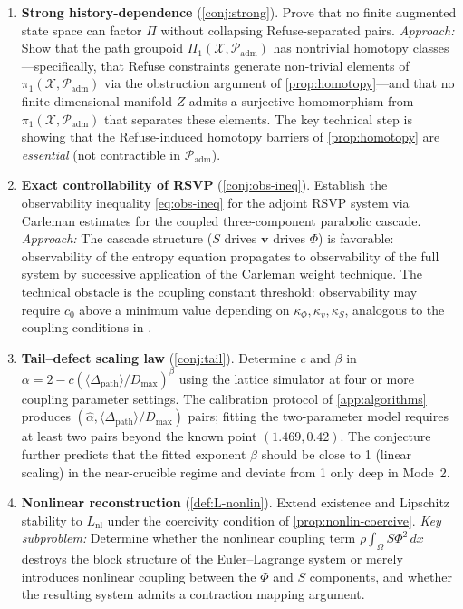 \documentclass[12pt, oneside]{memoir}
\newcommand{\X}{\mathcal{X}}
\newcommand{\Padm}{\mathcal{P}_{\mathrm{adm}}}
\newcommand{\Dpth}{\Delta_{\mathrm{path}}}
\newcommand{\bv}{\mathbf{v}}
\begin{document}
\begin{enumerate}
  \item \textbf{Strong history-dependence} (\cref{conj:strong}).  Prove that no finite
        augmented state space can factor $\Pi$ without collapsing Refuse-separated pairs.
        \textit{Approach:} Show that the path groupoid $\Pi_1(\X, \Padm)$ has nontrivial
        homotopy classes---specifically, that Refuse constraints generate non-trivial
        elements of $\pi_1(\X, \Padm)$ via the obstruction argument of
        \cref{prop:homotopy}---and that no finite-dimensional manifold $Z$ admits a
        surjective homomorphism from $\pi_1(\X, \Padm)$ that separates these elements.
        The key technical step is showing that the Refuse-induced homotopy barriers of
        \cref{prop:homotopy} are \emph{essential} (not contractible in $\Padm$).

  \item \textbf{Exact controllability of RSVP} (\cref{conj:obs-ineq}).  Establish the
        observability inequality \cref{eq:obs-ineq} for the adjoint RSVP system via
        Carleman estimates for the coupled three-component parabolic cascade.
        \textit{Approach:} The cascade structure ($S$ drives $\bv$ drives $\Phi$) is
        favorable: observability of the entropy equation propagates to observability of
        the full system by successive application of the Carleman weight technique.
        The technical obstacle is the coupling constant threshold: observability may
        require $c_0$ above a minimum value depending on $\kappa_\Phi, \kappa_v,
        \kappa_S$, analogous to the coupling conditions in \cite{gonzalez2006}.

  \item \textbf{Tail--defect scaling law} (\cref{conj:tail}).  Determine $c$ and $\beta$
        in $\alpha = 2 - c(\langle\Dpth\rangle/D_{\max})^\beta$ using the lattice
        simulator at four or more coupling parameter settings.  The calibration protocol
        of \cref{app:algorithms} produces $(\hat\alpha, \langle\Dpth\rangle/D_{\max})$
        pairs; fitting the two-parameter model requires at least two pairs beyond the
        known point $(1.469, 0.42)$.  The conjecture further predicts that the fitted
        exponent $\beta$ should be close to 1 (linear scaling) in the near-crucible
        regime and deviate from 1 only deep in Mode~2.

  \item \textbf{Nonlinear reconstruction} (\cref{def:L-nonlin}).  Extend existence and
        Lipschitz stability to $L_{\mathrm{nl}}$ under the coercivity condition of
        \cref{prop:nonlin-coercive}.  \textit{Key subproblem:} Determine whether the
        nonlinear coupling term $\rho \int_\Omega S\Phi^2\, dx$ destroys the block
        structure of the Euler--Lagrange system or merely introduces nonlinear coupling
        between the $\Phi$ and $S$ components, and whether the resulting system admits
        a contraction mapping argument.


\end{enumerate}
\end{document}
